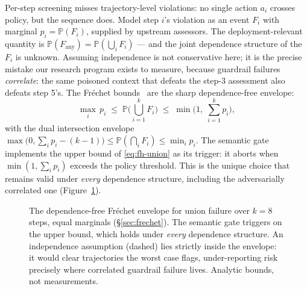 \documentclass[10pt,twocolumn,letterpaper]{article}
\begin{document}
Per-step screening misses trajectory-level violations: no single action
$a_i$ crosses policy, but the sequence does. Model step $i$'s violation as
an event $F_i$ with marginal $p_i = \mathbb{P}(F_i)$, supplied by upstream
assessors. The deployment-relevant quantity is
$\mathbb{P}(F_{\mathrm{any}}) = \mathbb{P}(\bigcup_i F_i)$ --- and the joint
dependence structure of the $F_i$ is unknown. Assuming independence is not
conservative here; it is the precise mistake our research program exists to
measure, because guardrail failures \emph{correlate}: the same poisoned
context that defeats the step-3 assessment also defeats step 5's. The
Fr\'echet bounds~\cite{nelsen2006copulas,boole1854laws} are the sharp
dependence-free envelope:
\begin{equation}
\max_i\, p_i \;\le\; \mathbb{P}\Big(\bigcup_{i=1}^{k} F_i\Big) \;\le\;
\min\Big(1,\; \sum_{i=1}^{k} p_i\Big),
\label{eq:fh-union}
\end{equation}
with the dual intersection envelope
$\max\!\big(0, \sum_i p_i - (k-1)\big) \le \mathbb{P}(\bigcap_i F_i) \le
\min_i p_i$. The semantic gate implements the upper bound of
\eqref{eq:fh-union} as its trigger: it aborts when
$\min(1, \sum_i p_i)$ exceeds the policy threshold. This is the unique
choice that remains valid under \emph{every} dependence structure, including
the adversarially correlated one (Figure~\ref{fig:frechet}).

\begin{figure}[t]
\centering
{}
\caption{The dependence-free Fr\'echet envelope for union failure over $k{=}8$
steps, equal marginals (\S\ref{sec:frechet}). The semantic gate triggers on the
upper bound, which holds under \emph{every} dependence structure. An
independence assumption (dashed) lies strictly inside the envelope: it would
clear trajectories the worst case flags, under-reporting risk precisely where
correlated guardrail failure lives. Analytic bounds, not measurements.}
\label{fig:frechet}
\end{figure}
\end{document}
